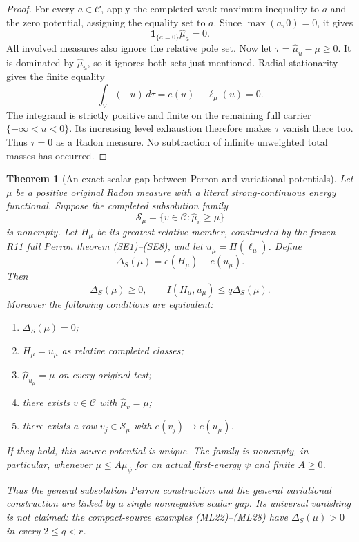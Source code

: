 \documentclass[11pt,a4paper]{article}
\numberwithin{equation}{section}
\newtheorem{theorem}{Theorem}[section]
\theoremstyle{definition}
\theoremstyle{remark}
\begin{document}
\begin{proof}
For every $a\in\mathscr C$, apply the completed weak
maximum inequality to $a$ and the zero potential, assigning
the equality set to $a$. Since $\max(a,0)=0$, it gives
\[
                   \mathbf1_{\{a=0\}}\widehat\mu_a=0.
 \tag{PV6}
\]
All involved measures also ignore the relative pole set.
Now let $\tau=\widehat\mu_u-\mu\geq0$. It is dominated
by $\widehat\mu_u$, so it ignores both sets just mentioned.
Radial stationarity gives the finite equality
\[
                       \int_V(-u)\,d\tau
                                  =e(u)-\ell_\mu(u)=0.
\]
The integrand is strictly positive and finite on the
remaining full carrier $\{-\infty<u<0\}$. Its increasing
level exhaustion therefore makes $\tau$ vanish there too.
Thus $\tau=0$ as a Radon measure. No subtraction of
infinite unweighted total masses has occurred.
\end{proof}

\begin{theorem}[An exact scalar gap between Perron and variational potentials]
\label{thm:r12-perron-variational-gap}
Let $\mu$ be a positive original Radon measure with a
literal strong-continuous energy functional. Suppose the
completed subsolution family
\[
             \mathscr S_\mu
               =\{v\in\mathscr C:\widehat\mu_v\geq\mu\}
 \tag{PV7}
\]
is nonempty. Let $H_\mu$ be its greatest relative member,
constructed by the frozen R11 full Perron theorem (SE1)--(SE8),
and let $u_\mu=\Pi(\ell_\mu)$. Define
\[
                  \Delta_S(\mu)=e(H_\mu)-e(u_\mu).
 \tag{PV8}
\]
Then
\[
              \Delta_S(\mu)\geq0,\qquad
              I(H_\mu,u_\mu)\leq q\Delta_S(\mu).
 \tag{PV9}
\]
Moreover the following conditions are equivalent:
\begin{enumerate}
\item $\Delta_S(\mu)=0$;
\item $H_\mu=u_\mu$ as relative completed classes;
\item $\widehat\mu_{u_\mu}=\mu$ on every original test;
\item there exists $v\in\mathscr C$ with $\widehat\mu_v=\mu$;
\item there exists a row $v_j\in\mathscr S_\mu$ with
      $e(v_j)\to e(u_\mu)$.
\end{enumerate}
If they hold, this source potential is unique. The family
is nonempty, in particular, whenever $\mu\leq A\mu_\psi$
for an actual first-energy $\psi$ and finite $A\geq0$.

Thus the general subsolution Perron construction and the
general variational construction are linked by a single
nonnegative scalar gap. Its universal vanishing is not
claimed: the compact-source examples (ML22)--(ML28) have
$\Delta_S(\mu)>0$ in every $2\leq q<r$.
\end{theorem}
\end{document}
